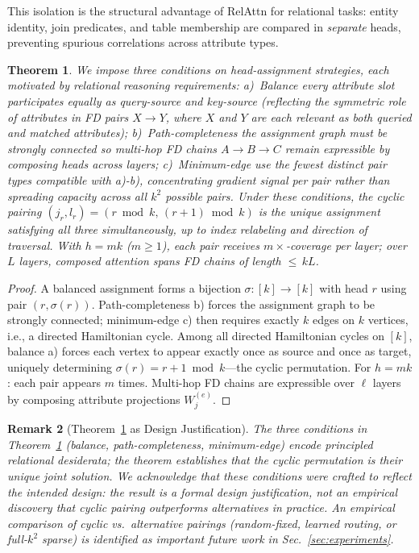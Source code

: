 \documentclass[conference]{IEEEtran}
\newtheorem{theorem}{Theorem}
\newtheorem{remark}[theorem]{Remark}
\begin{document}
This isolation is the structural advantage of RelAttn for relational tasks: entity identity, join predicates, and table membership are compared in \emph{separate} heads, preventing spurious correlations across attribute types.

\begin{theorem}
	\label{prop:coverage}
We impose three conditions on head-assignment strategies, each motivated by relational reasoning requirements: {a)~Balance} every attribute slot participates equally as query-source and key-source (reflecting the symmetric role of attributes in FD pairs $X \to Y$, where $X$ and $Y$ are each relevant as both queried and matched attributes); {b)~Path-completeness} the assignment graph must be strongly connected so multi-hop FD chains $A \to B \to C$ remain expressible by composing heads across layers; {c)~Minimum-edge} use the fewest distinct pair types compatible with a)-b), concentrating gradient signal per pair rather than spreading capacity across all $k^2$ possible pairs. Under these conditions, the cyclic pairing $(j_r, l_r) = (r \bmod k,\,(r{+}1) \bmod k)$ is the \emph{unique} assignment satisfying all three simultaneously, up to index relabeling and direction of traversal. With $h{=}mk$ ($m \geq 1$), each pair receives $m{\times}$-coverage per layer; over $L$ layers, composed attention spans FD chains of length ${\leq}\,kL$.
\end{theorem}

\begin{proof}
	\renewcommand{\qedsymbol}{}
A balanced assignment forms a bijection $\sigma\colon [k]\!\to\![k]$ with head $r$ using pair $(r,\sigma(r))$. Path-completeness b) forces the assignment graph to be strongly connected; minimum-edge c) then requires exactly $k$ edges on $k$ vertices, i.e., a directed Hamiltonian cycle. Among all directed Hamiltonian cycles on $[k]$, balance a) forces each vertex to appear exactly once as source and once as target, uniquely determining $\sigma(r) = r{+}1\bmod k$---the cyclic permutation. For $h{=}mk$: each pair appears $m$ times. Multi-hop FD chains are expressible over $\ell$ layers by composing attribute projections $W_j^{(e)}$.
\end{proof}

\begin{remark}[Theorem~\ref{prop:coverage} as Design Justification]
\label{rem:cyclic_design}
The three conditions in Theorem~\ref{prop:coverage} (balance, path-completeness, minimum-edge) encode principled relational desiderata; the theorem establishes that the cyclic permutation is their \emph{unique} joint solution. We acknowledge that these conditions were crafted to reflect the intended design: the result is a formal design justification, not an empirical discovery that cyclic pairing outperforms alternatives in practice. An empirical comparison of cyclic vs.\ alternative pairings (random-fixed, learned routing, or full-$k^2$ sparse) is identified as important future work in Sec.~\ref{sec:experiments}.
\end{remark}
\end{document}
